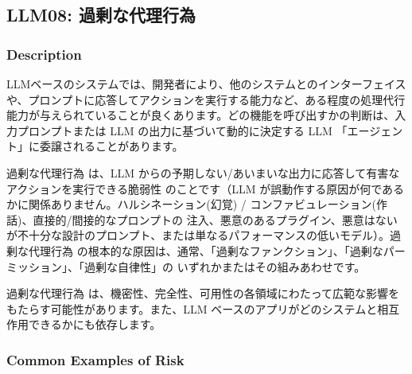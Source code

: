 \documentclass[
]{article}
\author{}
\date{}
\begin{document}
\subsection{LLM08:
過剰な代理行為}\label{llm08-ux904eux5270ux306aux4ee3ux7406ux884cux70ba}

\subsubsection{Description}\label{description}

LLMベースのシステムでは、開発者により、他のシステムとのインターフェイスや、プロンプトに応答してアクションを実行する能力など、ある程度の処理代行能力が与えられていることが良くあります。どの機能を呼び出すかの判断は、入力プロンプトまたは
LLM の出力に基づいて動的に決定する LLM
「エージェント」に委譲されることがあります。

過剰な代理行為 は、LLM
からの予期しない/あいまいな出力に応答して有害なアクションを実行できる脆弱性
のことです（LLM
が誤動作する原因が何であるかに関係ありません。ハルシネーション(幻覚) /
コンファビュレーション(作話)、直接的/間接的なプロンプトの
注入、悪意のあるプラグイン、悪意はないが不十分な設計のプロンプト、または単なるパフォーマンスの低いモデル）。過剰な代理行為
の根本的な原因は、通常、「過剰なファンクション」、「過剰なパーミッション」、「過剰な自律性」の
いずれかまたはその組みあわせです。

過剰な代理行為
は、機密性、完全性、可用性の各領域にわたって広範な影響をもたらす可能性があります。また、LLM
ベースのアプリがどのシステムと相互作用できるかにも依存します。

\subsubsection{Common Examples of Risk}\label{common-examples-of-risk}
\end{document}
